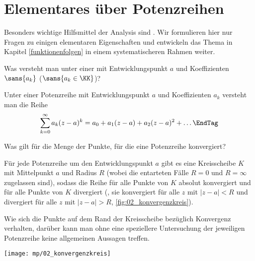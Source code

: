 \section{Elementares über Potenzreihen}
\label{elmenentare_potenzreihen}

Besonders wichtige Hilfsmittel der Analysis sind . 
Wir formulieren hier nur Fragen zu einigen elementaren Eigenschaften und 
entwickeln das Thema in 
Kapitel \ref{funktionenfolgen} in einem systematischeren 
Rahmen weiter.   

\begin{frage}\label{02_potr}
  Was versteht man unter einer  mit Entwicklungspunkt 
  $a$ und Koeffizienten $\sans{a_k}$ ($\sans{a_k\in\KK}$)?
\end{frage}

\begin{antwort}
  Unter einer Potenzreihe mit Entwicklungspunkt $a$ und Koeffizienten $a_k$ 
  versteht man die Reihe 
  \begin{equation}
    \sum_{k=0}^\infty a_k ( z-a)^k = a_0 + a_1(z-a)+a_2(z-a)^2 + \ldots \EndTag
  \end{equation}
\end{antwort}

\begin{frage}\label{02_kok}
  Was gilt f\"ur die Menge der Punkte, für die eine Potenzreihe 
  konvergiert?
\end{frage}
\begin{antwort}[]%
  \Ant Für jede Potenzreihe um den Entwicklungspunkt $a$ 
  gibt es eine Kreisscheibe $K$ 
  mit Mittelpunkt $a$ und Radius 
  $R$ (wobei die entarteten Fälle $R=0$ und $R=\infty$ zugelassen sind), 
  sodass die Reihe für alle Punkte  von $K$ absolut 
  konvergiert und für alle Punkte  von $K$ divergiert 
  ({\dasheisst}, sie konvergiert für alle $z$ mit $|z-a|<R$ und divergiert 
  für alle $z$ mit $|z-a|>R$, \sieheAbbildung\ref{fig:02_konvergenzkreis}). 
  
  Wie sich die Punkte auf dem Rand 
  der Kreisscheibe bezüglich Konvergenz verhalten, darüber kann 
  man ohne eine speziellere Untersuchung der jeweiligen Potenzreihe 
  keine allgemeinen Aussagen treffen. 
  \AntEnd

  \begin{center}
    \texttt{[image: mp/02\_konvergenzkreis]}
    \label{fig:02_konvergenzkreis}
  \end{center}
\end{antwort}

